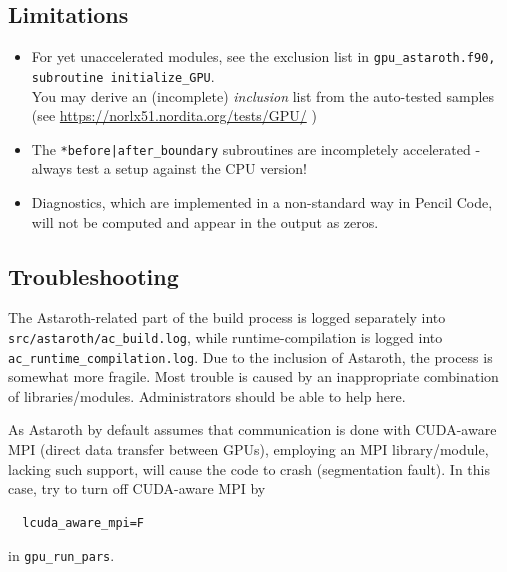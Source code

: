 \documentclass[a4paper,12pt]{article}
\newcommand{\command}[1]{\texttt{#1}}
\newcommand{\code}[1]{\texttt{#1}}
\begin{document}
\subsection{Limitations}
\begin{itemize}
\item For yet unaccelerated modules, see the exclusion list in \command{gpu\_astaroth.f90, subroutine initialize\_GPU}.\\
         You may derive an (incomplete) {\it inclusion} list from the auto-tested samples (see \url{https://norlx51.nordita.org/tests/GPU/} )
\item The \command{*before|after\_boundary} subroutines are incompletely accelerated - always test a setup against the CPU version!
\item Diagnostics, which are implemented in a non-standard way in Pencil Code, will not be computed and appear in the output as zeros.
\end{itemize}

\subsection{Troubleshooting}
The Astaroth-related part of the build process is logged separately into \code{src/astaroth/ac\_build.log}, while runtime-compilation is logged into \code{ac\_runtime\_compilation.log}.
Due to the inclusion of Astaroth, the process is somewhat more fragile. 
Most trouble is caused by an inappropriate combination of libraries/modules.
Administrators should be able to help here.

As Astaroth by default assumes that communication is done with CUDA-aware MPI (direct data transfer between GPUs),
employing an MPI library/module, lacking such support, will cause the code to crash (segmentation fault). 
In this case, try to turn off CUDA-aware MPI by
\begin{verbatim}
  lcuda_aware_mpi=F
\end{verbatim}
in \code{gpu\_run\_pars}.
\end{document}

